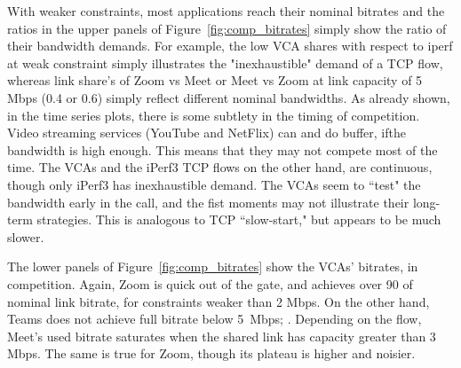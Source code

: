 With weaker constraints, most applications reach their nominal bitrates
  and the ratios in the upper panels of Figure~\ref{fig:comp_bitrates}
  simply show the ratio of their bandwidth demands.
For example, 
  the low VCA shares with respect to iperf at weak constraint
  simply illustrates the "inexhaustible" demand of a TCP flow,
  whereas link share's of Zoom vs Meet or Meet vs Zoom 
  at link capacity of 5 Mbps (0.4 or 0.6) simply 
  reflect different nominal bandwidths.
As already shown, in the time series plots, there is some subtlety in the timing of competition.
Video streaming services (YouTube and NetFlix)
  can and do buffer, ifthe bandwidth is high enough.
This means that they may not compete most of the time.
The VCAs and the iPerf3 TCP flows on the other hand, 
  are continuous, though only iPerf3 has inexhaustible demand.
The VCAs seem to ``test" the bandwidth early in the call, 
  and the fist moments may not illustrate their long-term strategies.
This is analogous to TCP ``slow-start,"
  but appears to be much slower.

The lower panels of Figure~\ref{fig:comp_bitrates} show
  the VCAs' bitrates, in competition.
Again, Zoom is quick out of the gate, and 
  achieves over 90 of nominal link bitrate,
  for constraints weaker than 2 Mbps.
On the other hand, Teams does not achieve full bitrate
  below 5~Mbps;
  .
Depending on the flow, Meet's used bitrate saturates
  when the shared link has capacity greater than 3 Mbps.
The same is true for Zoom, though its plateau is higher and noisier.
  

